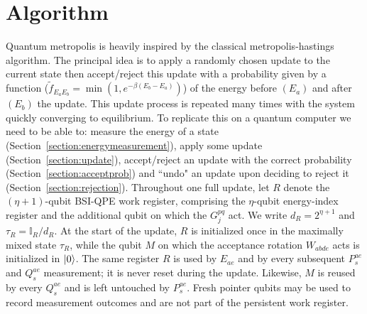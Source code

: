 \documentclass[aps,floatfix,10pt,amssymb,amsfont,amsmath,superscriptaddress,float,nofootinbib,longbibliography,nobalancelastpage,twocolumn]{revtex4-2}
\begin{document}
\section{Algorithm}
\label{section:algorithm}
Quantum metropolis is heavily inspired by the classical metropolis-hastings algorithm. The principal idea is to apply a randomly chosen update to the current state then accept/reject this update with a probability given by a function ($\tilde{f}_{E_aE_b}=\min(1, e^{-\beta(E_b-E_a)})$) of the energy before $(E_a)$ and after $(E_b)$ the update. This update process is repeated many times with the system quickly converging to equilibrium. To replicate this on a quantum computer we need to be able to: measure the energy of a state (Section~\ref{section:energymeasurement}), apply some update (Section~\ref{section:update}), accept/reject an update with the correct probability (Section~\ref{section:acceptprob}) and ``undo" an update upon deciding to reject it (Section~\ref{section:rejection}).
Throughout one full update, let $R$ denote the $(\eta+1)$-qubit BSI-QPE work register, comprising the $\eta$-qubit energy-index register and the additional qubit on which the $G_j^{pq}$ act. We write $d_R=2^{\eta+1}$ and $\tau_R=\mathbb{I}_R/d_R$. At the start of the update, $R$ is initialized once in the maximally mixed state $\tau_R$, while the qubit $M$ on which the acceptance rotation $W_{abde}$ acts is initialized in $\ket{0}$. The same register $R$ is used by $E_{ae}$ and by every subsequent $P_s^{ae}$ and $Q_s^{ae}$ measurement; it is never reset during the update. Likewise, $M$ is reused by every $Q_s^{ae}$ and is left untouched by $P_s^{ae}$. Fresh pointer qubits may be used to record measurement outcomes and are not part of the persistent work register.
\end{document}
